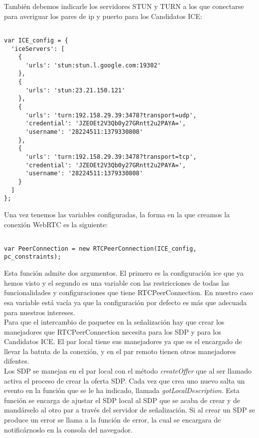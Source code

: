 También debemos indicarle los servidores STUN y TURN a los que conectarse para averiguar los pares de ip y puerto para los Candidatos ICE:\\

\begin{lstlisting}[caption=Servidores STUN y TURN]

var ICE_config = {
  'iceServers': [
    {
      'urls': 'stun:stun.l.google.com:19302'
    },
    {
      'urls': 'stun:23.21.150.121'
    },
    {
      'urls': 'turn:192.158.29.39:3478?transport=udp',
      'credential': 'JZEOEt2V3Qb0y27GRntt2u2PAYA=',
      'username': '28224511:1379330808'
    },
    {
      'urls': 'turn:192.158.29.39:3478?transport=tcp',
      'credential': 'JZEOEt2V3Qb0y27GRntt2u2PAYA=',
      'username': '28224511:1379330808'
    }
  ]
};

\end{lstlisting}

Una vez tenemos las variables configuradas, la forma en la que creamos la conexión WebRTC es la siguiente:\\

\begin{lstlisting}[caption=RTCPeerConnection.]

var PeerConnection = new RTCPeerConnection(ICE_config, pc_constraints);

\end{lstlisting}

Esta función admite dos argumentos. El primero es la configuración ice que ya hemos visto y el segundo es una variable con las restricciones de todas las funcionalidades y configuraciones que tiene RTCPeerConnection. En nuestro caso esa variable está vacía ya que la configuración por defecto es más que adecuada para nuestros intereses.\\

Para que el intercambio de paquetes en la señalización hay que crear los manejadores que RTCPeerConnection necesita para los SDP y para los Candidatos ICE. El par local tiene sus manejadores ya que es el encargado de llevar la batuta de la conexión, y en el par remoto tienen otros manejadores difentes. \\

Los SDP se manejan en el par local con el método \emph{createOffer} que al ser llamado activa el proceso de crear la oferta SDP. Cada vez que crea uno nuevo salta un evento en la función que se le ha indicado, llamada \emph{gotLocalDescription}. Esta función se encarga de ajustar el SDP local al SDP que se acaba de crear y de mandárselo al otro par a través del servidor de señalización. Si al crear un SDP se produce un error se llama a la función de error, la cual se encargara de notificárnoslo en la consola del navegador.\\


